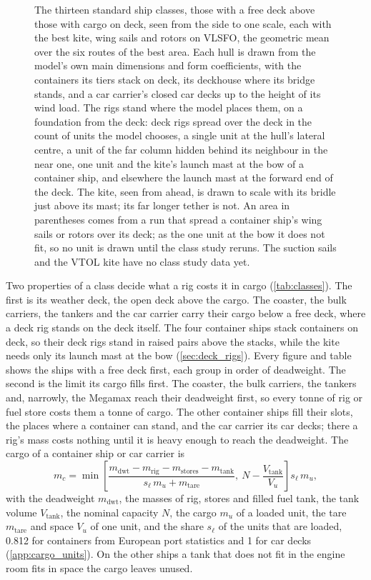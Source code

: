 \begin{figure}[tbp]
\centering
{}
\caption{ The thirteen standard ship classes, those with a free deck above those with cargo on deck, seen from the side to one scale, each with the best kite, wing sails and rotors on VLSFO, the geometric mean over the six routes of the best area. Each hull is drawn from the model's own main dimensions and form coefficients, with the containers its tiers stack on deck, its deckhouse where its bridge stands, and a car carrier's closed car decks up to the height of its wind load. The rigs stand where the model places them, on a foundation from the deck: deck rigs spread over the deck in the count of units the model chooses, a single unit at the hull's lateral centre, a unit of the far column hidden behind its neighbour in the near one, one unit and the kite's launch mast at the bow of a container ship, and elsewhere the launch mast at the forward end of the deck. The kite, seen from ahead, is drawn to scale with its bridle just above its mast; its far longer tether is not. An area in parentheses comes from a run that spread a container ship's wing sails or rotors over its deck; as the one unit at the bow it does not fit, so no unit is drawn until the class study reruns. The suction sails and the VTOL kite have no class study data yet.}
\label{fig:ship_classes}
\end{figure}

Two properties of a class decide what a rig costs it in cargo (\cref{tab:classes}). The first is its weather deck, the open deck above the cargo. The coaster, the bulk carriers, the tankers and the car carrier carry their cargo below a free deck, where a deck rig stands on the deck itself. The four container ships stack containers on deck, so their deck rigs stand in raised pairs above the stacks, while the kite needs only its launch mast at the bow (\cref{sec:deck_rigs}). Every figure and table shows the ships with a free deck first, each group in order of deadweight. The second is the limit its cargo fills first. The coaster, the bulk carriers, the tankers and, narrowly, the Megamax reach their deadweight first, so every tonne of rig or fuel store costs them a tonne of cargo. The other container ships fill their slots, the places where a container can stand, and the car carrier its car decks; there a rig's mass costs nothing until it is heavy enough to reach the deadweight. The cargo of a container ship or car carrier is
\begin{equation}
m_c=\min\left[\frac{m_\mathrm{dwt}-m_\mathrm{rig}-m_\mathrm{stores}-m_\mathrm{tank}}{s_\ell\,m_u+m_\mathrm{tare}},\ N-\frac{V_\mathrm{tank}}{V_u}\right]s_\ell\,m_u,
\end{equation}
with the deadweight $m_\mathrm{dwt}$, the masses of rig, stores and filled fuel tank, the tank volume $V_\mathrm{tank}$, the nominal capacity $N$, the cargo $m_u$ of a loaded unit, the tare $m_\mathrm{tare}$ and space $V_u$ of one unit, and the share $s_\ell$ of the units that are loaded, 0.812 for containers from European port statistics \citep{eurostat_mar_mg_am_cvh,eurostat_maritime_manual} and 1 for car decks (\cref{app:cargo_units}). On the other ships a tank that does not fit in the engine room fits in space the cargo leaves unused.

